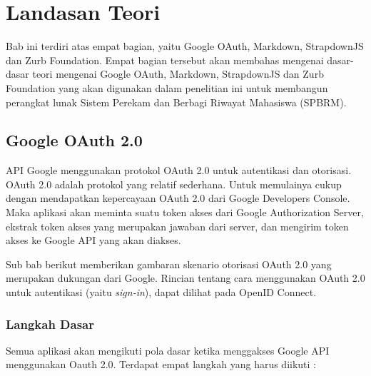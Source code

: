 \chapter{Landasan Teori}
\label{chap:landasanteori}

Bab ini terdiri atas empat bagian, yaitu Google OAuth, Markdown, StrapdownJS dan Zurb Foundation. Empat bagian tersebut akan membahas mengenai dasar-dasar teori mengenai Google OAuth, Markdown, StrapdownJS dan Zurb Foundation yang akan digunakan dalam penelitian ini untuk membangun perangkat lunak Sistem Perekam dan Berbagi Riwayat Mahasiswa (SPBRM).

\section{Google OAuth 2.0 \cite{Oauth:2013}}
\label{sec:googleauthentication}

API Google menggunakan protokol OAuth 2.0 untuk autentikasi dan otorisasi. OAuth 2.0 adalah protokol yang relatif sederhana. Untuk memulainya cukup dengan mendapatkan kepercayaan OAuth 2.0 dari Google Developers Console\footnotemark[1]. Maka aplikasi akan meminta suatu token akses dari Google Authorization Server, ekstrak token akses yang merupakan jawaban dari server, dan mengirim token akses ke Google API yang akan diakses.


Sub bab berikut memberikan gambaran skenario otorisasi OAuth 2.0 yang merupakan dukungan dari Google. Rincian tentang cara menggunakan OAuth 2.0 untuk autentikasi (yaitu {\it sign-in}), dapat dilihat pada OpenID Connect\footnotemark[2].

\subsection{Langkah Dasar}
Semua aplikasi akan mengikuti pola dasar ketika menggakses Google API menggunakan Oauth 2.0. Terdapat empat langkah yang harus diikuti :

